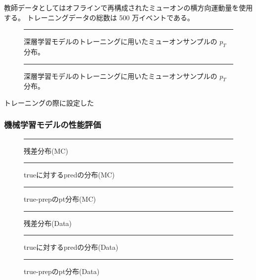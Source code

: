 教師データとしてはオフラインで再構成されたミューオンの横方向運動量を使用する。
トレーニングデータの総数は 500 万イベントである。

\begin{figure}[tb]
  \centering
  \rule{8cm}{6cm}
  \caption{深層学習モデルのトレーニングに用いたミューオンサンプルの $p_T$ 分布。}
  \label{fig:mu_pt_forMC}
\end{figure}

\begin{figure}[tb]
  \centering
  \rule{8cm}{6cm}
  \caption{深層学習モデルのトレーニングに用いたミューオンサンプルの $p_T$ 分布。}
  \label{fig:mu_pt_forData}
\end{figure}

トレーニングの際に設定した



\subsubsection{機械学習モデルの性能評価}



\begin{figure}[tb]
  \centering
  \rule{8cm}{6cm}
  \caption{残差分布(MC)}
  \label{fig:fit_def}
\end{figure}

\begin{figure}[tb]
  \centering
  \rule{8cm}{6cm}
  \caption{trueに対するpredの分布(MC)}
  \label{fig:fit_def}
\end{figure}

\begin{figure}[tb]
  \centering
  \rule{8cm}{6cm}
  \caption{true-prepのpt分布(MC)}
  \label{fig:fit_def}
\end{figure}

\begin{figure}[tb]
  \centering
  \rule{8cm}{6cm}
  \caption{残差分布(Data)}
  \label{fig:fit_def}
\end{figure}

\begin{figure}[tb]
  \centering
  \rule{8cm}{6cm}
  \caption{trueに対するpredの分布(Data)}
  \label{fig:fit_def}
\end{figure}

\begin{figure}[tb]
  \centering
  \rule{8cm}{6cm}
  \caption{true-prepのpt分布(Data)}
  \label{fig:fit_def}
\end{figure}


